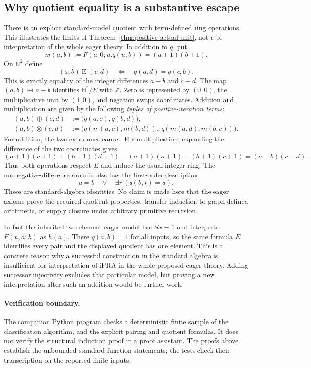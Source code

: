 \subsection{Why quotient equality is a substantive escape}

There is an explicit standard-model quotient with term-defined ring
operations. This illustrates the limits of
Theorem~\ref{thm:positive-actual-unit}, not a bi-interpretation of the
whole eager theory.
In addition to $q$, put
\[
                  m(a,b):=F(a,0;u.q(u,b))=(a+1)(b+1).
\]
On $\mathbb N^2$ define
\[
 (a,b)\mathrel E(c,d)
       \quad\Longleftrightarrow\quad q(a,d)=q(c,b).
\]
This is exactly equality of the integer differences $a-b$ and $c-d$.
The map $(a,b)\mapsto a-b$ identifies $\mathbb N^2/E$ with
$\mathbb Z$. Zero is represented by $(0,0)$, the multiplicative unit
by $(1,0)$, and negation swaps coordinates. Addition and multiplication
are given by the following
\emph{tuples of positive-iteration terms}:
\[
\begin{aligned}
 (a,b)\mathbin\oplus(c,d)
     &:=\bigl(q(a,c),q(b,d)\bigr),\\
 (a,b)\mathbin\otimes(c,d)
     &:=\bigl(q(m(a,c),m(b,d)),\ q(m(a,d),m(b,c))\bigr).
\end{aligned}
\]
For addition, the two extra ones cancel. For multiplication, expanding
the difference of the two coordinates gives
\[
 (a+1)(c+1)+(b+1)(d+1)
 -(a+1)(d+1)-(b+1)(c+1)
 =(a-b)(c-d).
\]
Thus both operations respect $E$ and induce the usual integer ring.
The nonnegative-difference domain also has the first-order description
\[
                 a=b\quad\lor\quad\exists r\,(q(b,r)=a).
\]
These are standard-algebra identities. No claim is made here that the
eager axioms prove the required quotient properties, transfer induction
to graph-defined arithmetic, or supply closure under arbitrary primitive
recursion.

In fact the inherited two-element eager model has $Sx=1$ and interprets
$F(n,a;h)$ as $h(a)$. There $q(a,b)=1$ for all inputs, so the same
formula $E$ identifies every pair and the displayed quotient has one
element. This is a concrete reason why a successful construction in
the standard algebra is insufficient for interpretation of iPRA in the
whole proposed eager theory. Adding successor injectivity excludes that
particular model, but proving a new interpretation after such an addition
would be further work.

\paragraph{Verification boundary.}
The companion Python program checks a deterministic finite sample of the
classification algorithm, and the explicit pairing and quotient formulas.
It does not verify the structural induction proof in a proof assistant.
The proofs above establish the unbounded standard-function statements;
the tests check their transcription on the reported finite inputs.
